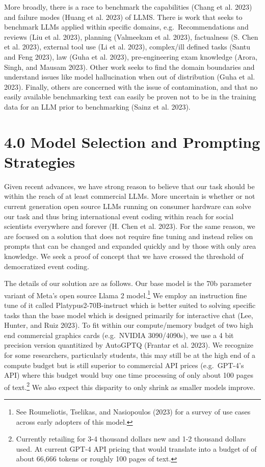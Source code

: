 \documentclass[
  letterpaper,
  DIV=11,
  numbers=noendperiod]{scrartcl}
\begin{document}
More broadly, there is a race to benchmark the capabilities (Chang et
al. 2023) and failure modes (Huang et al. 2023) of LLMS. There is work
that seeks to benchmark LLMs applied within specific domains,
e.g.~Recommendations and reviews (Liu et al. 2023), planning (Valmeekam
et al. 2023), factualness (S. Chen et al. 2023), external tool use (Li
et al. 2023), complex/ill defined tasks (Santu and Feng 2023), law (Guha
et al. 2023), pre-engineering exam knowledge (Arora, Singh, and Mausam
2023). Other work seeks to find the domain boundaries and understand
issues like model hallucination when out of distribution (Guha et al.
2023). Finally, others are concerned with the issue of contamination,
and that no easily available benchmarking text can easily be proven not
to be in the training data for an LLM prior to benchmarking (Sainz et
al. 2023).

\hypertarget{model-selection-and-prompting-strategies}{%
\section{4.0 Model Selection and Prompting
Strategies}\label{model-selection-and-prompting-strategies}}

Given recent advances, we have strong reason to believe that our task
should be within the reach of at least commercial LLMs. More uncertain
is whether or not current generation open source LLMs running on
consumer hardware can solve our task and thus bring international event
coding within reach for social scientists everywhere and forever (H.
Chen et al. 2023). For the same reason, we are focused on a solution
that does not require fine tuning and instead relies on prompts that can
be changed and expanded quickly and by those with only area knowledge.
We seek a proof of concept that we have crossed the threshold of
democratized event coding.

The details of our solution are as follows. Our base model is the 70b
parameter variant of Meta's open source Llama 2 model.\footnote{See
  Roumeliotis, Tselikas, and Nasiopoulos (2023) for a survey of use
  cases across early adopters of this model.} We employ an instruction
fine tune of it called Platypus2-70B-instruct which is better suited to
solving specific tasks than the base model which is designed primarily
for interactive chat (Lee, Hunter, and Ruiz 2023). To fit within our
compute/memory budget of two high end commercial graphics cards
(e.g.~NVIDIA 3090/4090s), we use a 4 bit precision version quantitized
by AutoGPTQ (Frantar et al. 2023). We recognize for some researchers,
particularly students, this may still be at the high end of a compute
budget but is still superior to commercial API prices (e.g.~GPT-4's API)
where this budget would buy one time processing of only about 100 pages
of text.\footnote{Currently retailing for 3-4 thousand dollars new and
  1-2 thousand dollars used. At current GPT-4 API pricing that would
  translate into a budget of of about 66,666 tokens or roughly 100 pages
  of text.} We also expect this disparity to only shrink as smaller
models improve.
\end{document}
